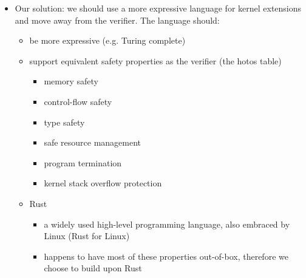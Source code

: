 \begin{itemize}
\begin{itemize}
        \end{itemize}
    \item Our solution: we should use a more expressive language for kernel
        extensions and move away from the verifier. The language should:
        \begin{itemize}
            \item be more expressive (e.g. Turing complete)
            \item support equivalent safety properties as the verifier (the
                hotos table)
                \begin{itemize}
                    \item memory safety
                    \item control-flow safety
                    \item type safety
                    \item safe resource management
                    \item program termination
                    \item kernel stack overflow protection
                \end{itemize}
            \item Rust
                \begin{itemize}
                    \item a widely used high-level programming language, also
                        embraced by Linux (Rust for Linux)
                    \item happens to have most of these properties out-of-box,
                        therefore we choose to build upon Rust
                \end{itemize}
        \end{itemize}
\end{itemize}